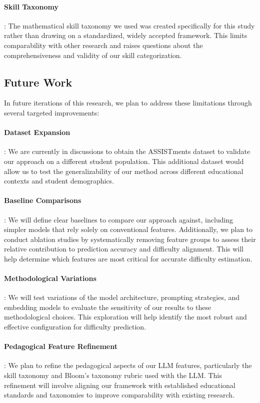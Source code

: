 \documentclass[
    a4paper, %
    10pt, %
    twoside, %
]{LTJournalArticle}
\begin{document}
\paragraph{Skill Taxonomy}: The mathematical skill taxonomy we used was created specifically for this study rather than drawing on a standardized, widely accepted framework. This limits comparability with other research and raises questions about the comprehensiveness and validity of our skill categorization.

\subsection{Future Work}

In future iterations of this research, we plan to address these limitations through several targeted improvements:

\paragraph{Dataset Expansion}: We are currently in discussions to obtain the ASSISTments dataset to validate our approach on a different student population. This additional dataset would allow us to test the generalizability of our method across different educational contexts and student demographics.
    
\paragraph{Baseline Comparisons}: We will define clear baselines to compare our approach against, including simpler models that rely solely on conventional features. Additionally, we plan to conduct ablation studies by systematically removing feature groups to assess their relative contribution to prediction accuracy and difficulty alignment. This will help determine which features are most critical for accurate difficulty estimation.
    
\paragraph{Methodological Variations}: We will test variations of the model architecture, prompting strategies, and embedding models to evaluate the sensitivity of our results to these methodological choices. This exploration will help identify the most robust and effective configuration for difficulty prediction.
    
\paragraph{Pedagogical Feature Refinement}: We plan to refine the pedagogical aspects of our LLM features, particularly the skill taxonomy and Bloom's taxonomy rubric used with the LLM. This refinement will involve aligning our framework with established educational standards and taxonomies to improve comparability with existing research.
    
\end{document}
